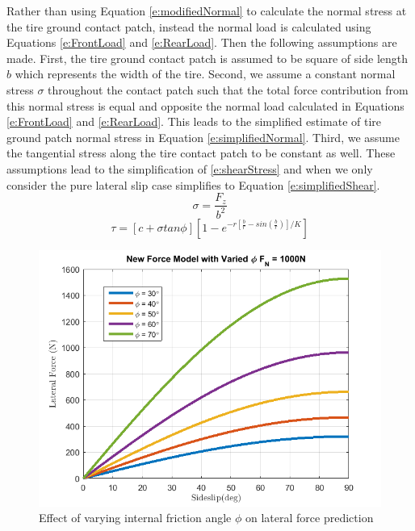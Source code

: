 \documentclass[12pt,onecolumn]{report}
\begin{document}
Rather than using Equation \ref{e:modifiedNormal} to calculate the normal stress at the tire ground contact patch, instead the normal load is calculated using Equations \ref{e:FrontLoad} and \ref{e:RearLoad}. Then the following assumptions are made. First, the tire ground contact patch is assumed to be square of side length $b$ which represents the width of the tire. Second, we assume a constant normal stress $\sigma$ throughout the contact patch such that the total force contribution from this normal stress is equal and opposite the normal load calculated in Equations \ref{e:FrontLoad} and \ref{e:RearLoad}. This leads to the simplified estimate of tire ground patch normal stress in Equation \ref{e:simplifiedNormal}. Third, we assume the tangential stress along the tire contact patch to be constant as well. These assumptions lead to the simplification of \ref{e:shearStress} and when we only consider the pure lateral slip case simplifies to Equation \ref{e:simplifiedShear}.
%
\begin{equation}\label{e:simplifiedNormal}
\sigma = \frac{F_z}{b^2}
\end{equation}
\begin{equation}\label{e:simplifiedShear}
\tau = [c+\sigma tan\phi][1 - e^{-r[\frac{b}{r} - sin\left(\frac{b}{r}\right)]/K}]
\end{equation}

\begin{figure}
	\centering
	\includegraphics[width=0.8\columnwidth]{Figs/variedPhi.png}
	\caption{\small Effect of varying internal friction angle $\phi$ on lateral force prediction}  
	\label{fig:newForceComparison}
\end{figure}
\end{document}
